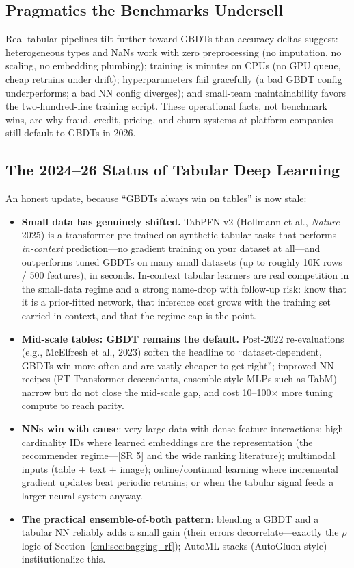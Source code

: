 \subsection{Pragmatics the Benchmarks Undersell}

Real tabular pipelines tilt further toward GBDTs than accuracy deltas suggest: heterogeneous types and NaNs work with zero preprocessing (no imputation, no scaling, no embedding plumbing); training is minutes on CPUs (no GPU queue, cheap retrains under drift); hyperparameters fail gracefully (a bad GBDT config underperforms; a bad NN config diverges); and small-team maintainability favors the two-hundred-line training script. These operational facts, not benchmark wins, are why fraud, credit, pricing, and churn systems at platform companies still default to GBDTs in 2026.

\subsection{The 2024--26 Status of Tabular Deep Learning}

An honest update, because ``GBDTs always win on tables'' is now stale:
\begin{itemize}
    \item \textbf{Small data has genuinely shifted.} TabPFN v2 (Hollmann et al., \textit{Nature} 2025) is a transformer pre-trained on synthetic tabular tasks that performs \textit{in-context} prediction---no gradient training on your dataset at all---and outperforms tuned GBDTs on many small datasets (up to roughly 10K rows / 500 features), in seconds. In-context tabular learners are real competition in the small-data regime and a strong name-drop with follow-up risk: know that it is a prior-fitted network, that inference cost grows with the training set carried in context, and that the regime cap is the point.
    \item \textbf{Mid-scale tables: GBDT remains the default.} Post-2022 re-evaluations (e.g., McElfresh et al., 2023) soften the headline to ``dataset-dependent, GBDTs win more often and are vastly cheaper to get right''; improved NN recipes (FT-Transformer descendants, ensemble-style MLPs such as TabM) narrow but do not close the mid-scale gap, and cost 10--100$\times$ more tuning compute to reach parity.
    \item \textbf{NNs win with cause}: very large data with dense feature interactions; high-cardinality IDs where learned embeddings are the representation (the recommender regime---[SR 5] and the wide ranking literature); multimodal inputs (table + text + image); online/continual learning where incremental gradient updates beat periodic retrains; or when the tabular signal feeds a larger neural system anyway.
    \item \textbf{The practical ensemble-of-both pattern}: blending a GBDT and a tabular NN reliably adds a small gain (their errors decorrelate---exactly the $\rho$ logic of Section~\ref{cml:sec:bagging_rf}); AutoML stacks (AutoGluon-style) institutionalize this.
\end{itemize}

